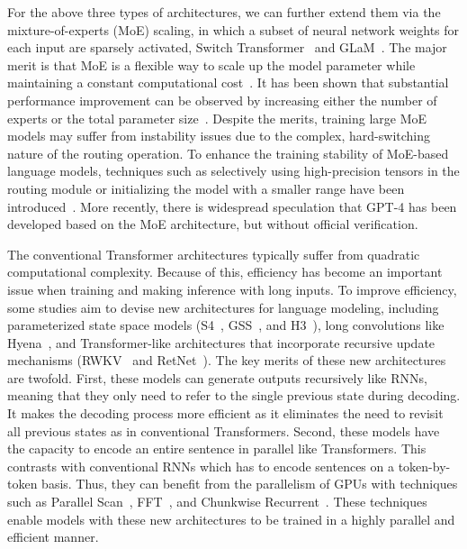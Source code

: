 { For the above three types of architectures, we can  further extend  them via  the mixture-of-experts (MoE) scaling, in which a subset of neural network weights for each input are sparsely activated, \eg Switch Transformer~\cite{Fedus-JMLR-2021-Switch} and GLaM~\cite{Du-ICML-2022-GLaM}.  %
{The major merit is that MoE is a flexible way to scale up the model parameter while maintaining a constant computational cost~\cite{Fedus-JMLR-2021-Switch}.} It has been shown that substantial  performance improvement can be observed by increasing either the number of experts or the total parameter size~\cite{Clark-ICML-2022-Unified}.  {Despite the merits, training large MoE models may suffer from instability issues due to the complex, hard-switching nature of the routing operation. 
To enhance the training stability of MoE-based language models, techniques such as selectively using high-precision tensors in the routing module or initializing the model with a smaller range have been introduced~\cite{Fedus-JMLR-2021-Switch}.
More recently, there is  widespread speculation that GPT-4 has been developed based on  the MoE architecture, but without official verification. 
} 

{The conventional Transformer architectures typically suffer from quadratic computational complexity. Because of this, efficiency  has become an important issue when training and making inference with long inputs. To improve efficiency, some studies aim to devise new architectures for language modeling, including parameterized state space models (\eg S4~\cite{gu-2022-iclr-efficiently}, GSS~\cite{Mehta-2022-arxiv-long}, and H3~\cite{dao-2022-arxiv-hungry}), long convolutions like Hyena~\cite{poli-2023-icml-hyena}, and Transformer-like architectures that incorporate recursive update mechanisms (\eg RWKV~\cite{peng-2023-arxiv-rwkv} and RetNet~\cite{sun-2023-arxiv-retnet}).  
{The key merits of these new architectures are twofold. First, these models can generate outputs recursively like RNNs, meaning that they only need to refer to the  single previous state during decoding. It makes the decoding process more efficient as it eliminates the need to revisit all previous states as in conventional Transformers. Second, these models have the capacity to encode an entire sentence in parallel like Transformers. This contrasts with conventional RNNs which has to encode sentences on a token-by-token basis. Thus, they can  benefit from the parallelism of GPUs with techniques such as Parallel Scan~\cite{smith-2023-iclr-s5,orvieto-2023-icml-lru}, FFT~\cite{poli-2023-icml-hyena,peng-2023-arxiv-rwkv}, and Chunkwise Recurrent~\cite{sun-2023-arxiv-retnet}. These techniques enable models with these new architectures to be trained in a highly parallel and efficient manner.}

}}
